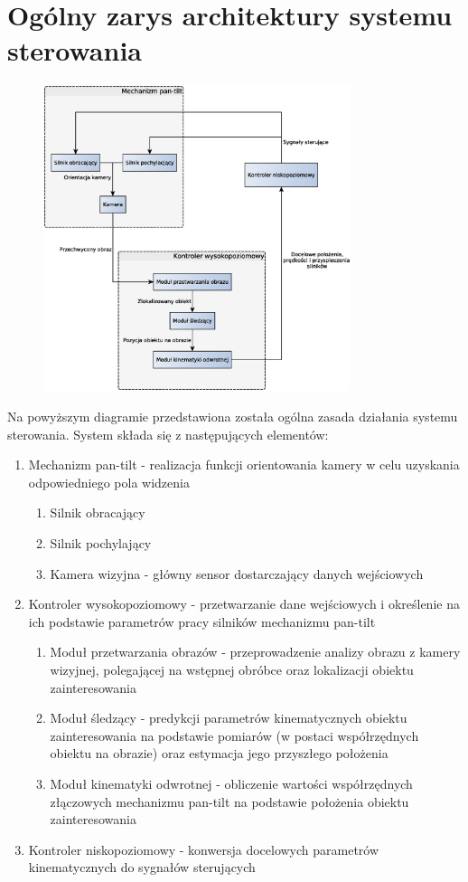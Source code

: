 \chapter{Ogólny zarys architektury systemu sterowania}
\label{cha:Ogolny_zarys_architektury_systemu_sterowania}

\begin{figure}[!htb]
	\centering
	\includegraphics[width=9cm]{Images/system_overview.eps} 
\end{figure}

Na powyższym diagramie przedstawiona została ogólna zasada działania systemu sterowania. System składa się z następujących elementów:
\begin{enumerate}
	\item Mechanizm pan-tilt - realizacja funkcji orientowania kamery w celu uzyskania odpowiedniego pola widzenia
	\begin{enumerate}
		\item Silnik obracający
		\item Silnik pochylający
		\item Kamera wizyjna - główny sensor dostarczający danych wejściowych	
	\end{enumerate}	 
	\item Kontroler wysokopoziomowy - przetwarzanie dane wejściowych i określenie na ich podstawie parametrów pracy silników mechanizmu pan-tilt
	\begin{enumerate}
		\item Moduł przetwarzania obrazów - przeprowadzenie analizy obrazu z kamery wizyjnej, polegającej na wstępnej obróbce oraz lokalizacji obiektu zainteresowania
		\item Moduł śledzący - predykcji parametrów kinematycznych obiektu zainteresowania na podstawie pomiarów (w postaci współrzędnych obiektu na obrazie) oraz
			  estymacja jego przyszłego położenia
		\item Moduł kinematyki odwrotnej - obliczenie wartości współrzędnych złączowych mechanizmu pan-tilt na podstawie położenia obiektu zainteresowania
	\end{enumerate}
	\item Kontroler niskopoziomowy - konwersja docelowych parametrów kinematycznych do sygnałów sterujących
\end{enumerate}

